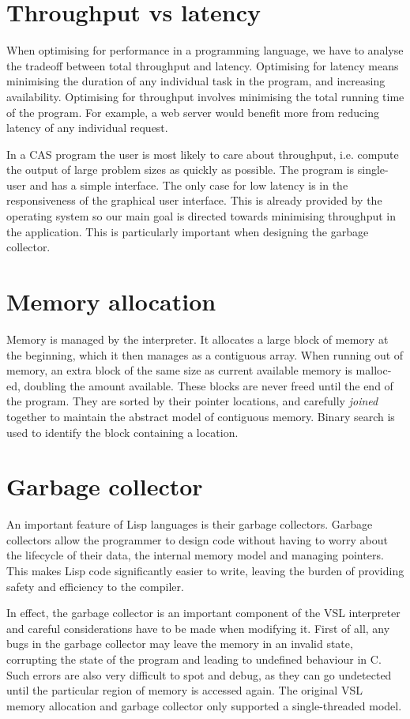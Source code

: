 \section{Throughput vs latency}
When optimising for performance in a programming language, we have to analyse the tradeoff between
total throughput and latency. Optimising for latency means minimising the duration of any individual
task in the program, and increasing availability. Optimising for throughput involves minimising the
total running time of the program. For example, a web server would benefit more from reducing latency
of any individual request.

In a CAS program the user is most likely to care about throughput, i.e. compute the output of large
problem sizes as quickly as possible. The program is single-user and has a simple interface. The only case
for low latency is in the responsiveness of the graphical user interface. This is already provided by the
operating system so our main goal is directed towards minimising throughput in the application.
This is particularly important when designing the garbage collector.

\section{Memory allocation}
Memory is managed by the interpreter. It allocates a large block of memory at the beginning,
which it then manages as a contiguous array. When running out of memory, an extra block of the
same size as current available memory is malloc-ed, doubling the amount available. These blocks are
never freed until the end of the program. They are sorted by their pointer locations,
and carefully \emph{joined} together to maintain the abstract model of contiguous memory. Binary search
is used to identify the block containing a location.

\section{Garbage collector}
An important feature of Lisp languages is their garbage collectors. Garbage collectors allow the programmer
to design code without having to worry about the lifecycle of their data, the internal memory model and
managing pointers. This makes Lisp code significantly easier to write, leaving the burden of providing safety and
efficiency to the compiler.

In effect, the garbage collector is an important component of the VSL interpreter and careful considerations
have to be made when modifying it. First of all, any bugs in the garbage collector may leave the memory in
an invalid state, corrupting the state of the program and leading to undefined behaviour in C. Such errors
are also very difficult to spot and debug, as they can go undetected until the particular region of memory
is accessed again. The original VSL memory allocation and garbage collector only supported a single-threaded model.

